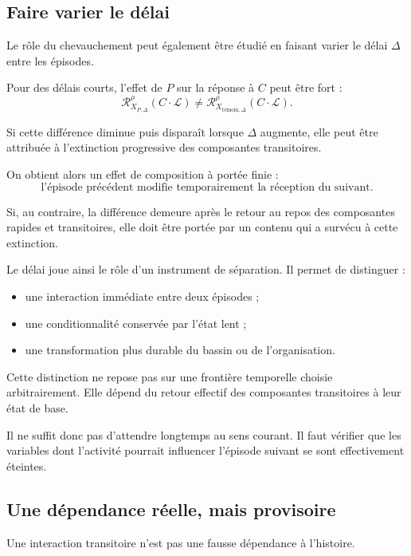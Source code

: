 \subsection{Faire varier le délai}

Le rôle du chevauchement peut également être étudié en faisant varier le délai $\Delta$ entre les épisodes.

Pour des délais courts, l'effet de $P$ sur la réponse à $C$ peut être fort :
\[
\mathcal R_{X_{P,\Delta}}^\rho
\left(C\cdot\mathcal L\right)
\neq
\mathcal R_{X_{\text{t\'emoin},\Delta}}^\rho
\left(C\cdot\mathcal L\right).
\]

Si cette différence diminue puis disparaît lorsque $\Delta$ augmente, elle peut être attribuée à l'extinction progressive des composantes transitoires.

On obtient alors un effet de composition à portée finie :
\[
\text{l'épisode précédent modifie temporairement la réception du
suivant.}
\]

Si, au contraire, la différence demeure après le retour au repos des composantes rapides et transitoires, elle doit être portée par un contenu qui a survécu à cette extinction.

Le délai joue ainsi le rôle d'un instrument de séparation. Il permet de distinguer :

\begin{itemize}
\tightlist
\item
  une interaction immédiate entre deux épisodes ;
\item
  une conditionnalité conservée par l'état lent ;
\item
  une transformation plus durable du bassin ou de l'organisation.
\end{itemize}

Cette distinction ne repose pas sur une frontière temporelle choisie arbitrairement. Elle dépend du retour effectif des composantes transitoires à leur état de base.

Il ne suffit donc pas d'attendre longtemps au sens courant. Il faut vérifier que les variables dont l'activité pourrait influencer l'épisode suivant se sont effectivement éteintes.

\subsection{Une dépendance réelle, mais provisoire}

Une interaction transitoire n'est pas une fausse dépendance à l'histoire.

